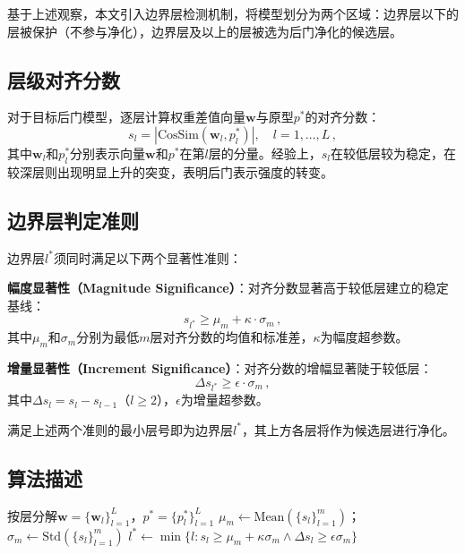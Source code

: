 基于上述观察，本文引入边界层检测机制，将模型划分为两个区域：边界层以下的层被保护（不参与净化），边界层及以上的层被选为后门净化的候选层。

\subsection{层级对齐分数}

对于目标后门模型，逐层计算权重差值向量$\mathbf{w}$与原型$p^*$的对齐分数：
\begin{equation}
s_l = |\text{CosSim}(\mathbf{w}_l, p_l^*)| , \quad l = 1, \ldots, L \, ,
\end{equation}
其中$\mathbf{w}_l$和$p_l^*$分别表示向量$\mathbf{w}$和$p^*$在第$l$层的分量。经验上，$s_l$在较低层较为稳定，在较深层则出现明显上升的突变，表明后门表示强度的转变。

\subsection{边界层判定准则}

边界层$l^*$须同时满足以下两个显著性准则：

\textbf{幅度显著性（Magnitude Significance）}：对齐分数显著高于较低层建立的稳定基线：
\begin{equation}
s_{l^*} \geq \mu_m + \kappa \cdot \sigma_m \, ,
\end{equation}
其中$\mu_m$和$\sigma_m$分别为最低$m$层对齐分数的均值和标准差，$\kappa$为幅度超参数。

\textbf{增量显著性（Increment Significance）}：对齐分数的增幅显著陡于较低层：
\begin{equation}
\Delta s_{l^*} \geq \epsilon \cdot \sigma_m \, ,
\end{equation}
其中$\Delta s_l = s_l - s_{l-1}$（$l \geq 2$），$\epsilon$为增量超参数。

满足上述两个准则的最小层号即为边界层$l^*$，其上方各层将作为候选层进行净化。

\subsection{算法描述}

\begin{algorithm}[htbp]
\caption{边界层检测（阶段三）}
\label{alg:stage3}
按层分解$\mathbf{w} = \{\mathbf{w}_l\}_{l=1}^{L}$，$p^* = \{p_l^*\}_{l=1}^{L}$\;
$\mu_m \leftarrow \text{Mean}(\{s_l\}_{l=1}^{m})$；$\sigma_m \leftarrow \text{Std}(\{s_l\}_{l=1}^{m})$\;
$l^* \leftarrow \min\{l : s_l \geq \mu_m + \kappa \sigma_m \wedge \Delta s_l \geq \epsilon \sigma_m\}$\;
\end{algorithm}

